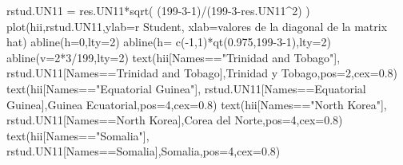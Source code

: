 \documentclass[
]{article}
\newenvironment{Shaded}{\begin{snugshade}}{\end{snugshade}}
\newcommand{\AttributeTok}[1]{\textcolor[rgb]{0.77,0.63,0.00}{#1}}
\newcommand{\DecValTok}[1]{\textcolor[rgb]{0.00,0.00,0.81}{#1}}
\newcommand{\FloatTok}[1]{\textcolor[rgb]{0.00,0.00,0.81}{#1}}
\newcommand{\FunctionTok}[1]{\textcolor[rgb]{0.00,0.00,0.00}{#1}}
\newcommand{\NormalTok}[1]{#1}
\newcommand{\OtherTok}[1]{\textcolor[rgb]{0.56,0.35,0.01}{#1}}
\newcommand{\SpecialCharTok}[1]{\textcolor[rgb]{0.00,0.00,0.00}{#1}}
\newcommand{\StringTok}[1]{\textcolor[rgb]{0.31,0.60,0.02}{#1}}
\begin{document}
\begin{Shaded}
\begin{Highlighting}[]
\NormalTok{rstud.UN11 }\OtherTok{=}\NormalTok{ res.UN11}\SpecialCharTok{*}\FunctionTok{sqrt}\NormalTok{( (}\DecValTok{199{-}3{-}1}\NormalTok{)}\SpecialCharTok{/}\NormalTok{(}\DecValTok{199{-}3}\SpecialCharTok{{-}}\NormalTok{res.UN11}\SpecialCharTok{\^{}}\DecValTok{2}\NormalTok{) )}
\FunctionTok{plot}\NormalTok{(hii,rstud.UN11,}\AttributeTok{ylab=}\StringTok{\textquotesingle{}r Student\textquotesingle{}}\NormalTok{,}
     \AttributeTok{xlab=}\StringTok{\textquotesingle{}valores de la diagonal de la matrix hat\textquotesingle{}}\NormalTok{)}
\FunctionTok{abline}\NormalTok{(}\AttributeTok{h=}\DecValTok{0}\NormalTok{,}\AttributeTok{lty=}\DecValTok{2}\NormalTok{)}
\FunctionTok{abline}\NormalTok{(}\AttributeTok{h=} \FunctionTok{c}\NormalTok{(}\SpecialCharTok{{-}}\DecValTok{1}\NormalTok{,}\DecValTok{1}\NormalTok{)}\SpecialCharTok{*}\FunctionTok{qt}\NormalTok{(}\FloatTok{0.975}\NormalTok{,}\DecValTok{199{-}3{-}1}\NormalTok{),}\AttributeTok{lty=}\DecValTok{2}\NormalTok{)}
\FunctionTok{abline}\NormalTok{(}\AttributeTok{v=}\DecValTok{2}\SpecialCharTok{*}\DecValTok{3}\SpecialCharTok{/}\DecValTok{199}\NormalTok{,}\AttributeTok{lty=}\DecValTok{2}\NormalTok{)}
\FunctionTok{text}\NormalTok{(hii[Names}\SpecialCharTok{==}\StringTok{"Trinidad and Tobago"}\NormalTok{],}
\NormalTok{     rstud.UN11[Names}\SpecialCharTok{==}\StringTok{\textquotesingle{}Trinidad and Tobago\textquotesingle{}}\NormalTok{],}\StringTok{\textquotesingle{}Trinidad y Tobago\textquotesingle{}}\NormalTok{,}\AttributeTok{pos=}\DecValTok{2}\NormalTok{,}\AttributeTok{cex=}\FloatTok{0.8}\NormalTok{)}
\FunctionTok{text}\NormalTok{(hii[Names}\SpecialCharTok{==}\StringTok{"Equatorial Guinea"}\NormalTok{],}
\NormalTok{     rstud.UN11[Names}\SpecialCharTok{==}\StringTok{\textquotesingle{}Equatorial Guinea\textquotesingle{}}\NormalTok{],}\StringTok{\textquotesingle{}Guinea Ecuatorial\textquotesingle{}}\NormalTok{,}\AttributeTok{pos=}\DecValTok{4}\NormalTok{,}\AttributeTok{cex=}\FloatTok{0.8}\NormalTok{)}
\FunctionTok{text}\NormalTok{(hii[Names}\SpecialCharTok{==}\StringTok{"North Korea"}\NormalTok{],}
\NormalTok{     rstud.UN11[Names}\SpecialCharTok{==}\StringTok{\textquotesingle{}North Korea\textquotesingle{}}\NormalTok{],}\StringTok{\textquotesingle{}Corea del Norte\textquotesingle{}}\NormalTok{,}\AttributeTok{pos=}\DecValTok{4}\NormalTok{,}\AttributeTok{cex=}\FloatTok{0.8}\NormalTok{)}
\FunctionTok{text}\NormalTok{(hii[Names}\SpecialCharTok{==}\StringTok{"Somalia"}\NormalTok{],}
\NormalTok{     rstud.UN11[Names}\SpecialCharTok{==}\StringTok{\textquotesingle{}Somalia\textquotesingle{}}\NormalTok{],}\StringTok{\textquotesingle{}Somalia\textquotesingle{}}\NormalTok{,}\AttributeTok{pos=}\DecValTok{4}\NormalTok{,}\AttributeTok{cex=}\FloatTok{0.8}\NormalTok{)}

\end{Highlighting}
\end{Shaded}
\end{document}
